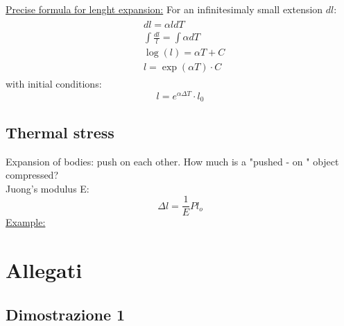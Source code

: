 \documentclass[a4paper,11pt]{article}
\begin{document}
\underline{Precise formula for lenght expansion:}
For an infinitesimaly small extension $dl$:
\begin{align}
  \begin{aligned}
    & d l=\alpha l d T \\
    & \int \frac{d l}{l}=\int \alpha d T  \\
    & \log (l)=\alpha T+C \\
    & l=\exp (\alpha T) \cdot C
  \end{aligned}
\end{align}
with initial conditions: 
$$ l = e^{\alpha \Delta T} \cdot l_0 $$

\subsection{Thermal stress}
Expansion of bodies: push on each other. How much is a "pushed - on " object compressed? \\
Juong's modulus E:
$$ \Delta l = \frac{1}{E} P l_o $$ 
\underline{Example:} 



\pagebreak



\section{Allegati}
\label{sec:allegati}
\subsection{Dimostrazione 1}
\label{sec:Dimostrazione 1}
\end{document}
